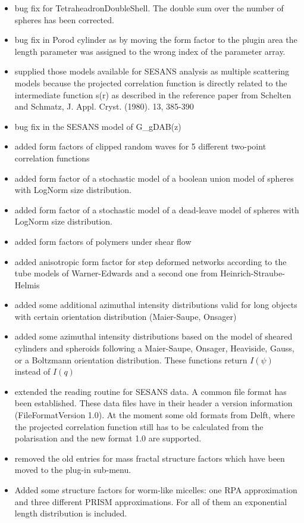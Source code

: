 \begin{description}
\begin{itemize}
    \item bug fix for TetraheadronDoubleShell. The double sum over the number of spheres has been corrected.
    \item bug fix in Porod cylinder as by moving the form factor to the plugin area the length parameter was assigned to the wrong index of the parameter array.
    \item supplied those models available for SESANS analysis as multiple scattering models because the projected correlation function is directly related to the intermediate function s(r) as described in the reference paper from Schelten and Schmatz, J. Appl. Cryst. (1980). 13, 385-390
    \item bug fix in the SESANS model of G\_gDAB(z)
    \item added form factors of clipped random waves for 5 different two-point correlation functions
    \item added form factor of a stochastic model of a boolean union model of spheres with LogNorm size distribution.
    \item added form factor of a stochastic model of a dead-leave model of spheres with LogNorm size distribution.
    \item added form factors of polymers under shear flow
    \item added anisotropic form factor for step deformed networks according to the tube models of Warner-Edwards and a second one from Heinrich-Straube-Helmis
     \item added some additional azimuthal intensity distributions valid for long objects with certain orientation distribution (Maier-Saupe, Onsager)
     \item added some azimuthal intensity distributions based on the model of sheared cylinders and spheroids following a Maier-Saupe, Onsager, Heaviside, Gauss, or a Boltzmann orientation distribution. These functions return $I(\psi)$ instead of $I(q)$
     \item extended the reading routine for SESANS data. A common file format has been established. These data files have in their header a version information (FileFormatVersion 1.0). At the moment some old formats from Delft, where the projected correlation function still has to be calculated from the polarisation and the new format 1.0 are supported.
    \item  removed the old entries for mass fractal structure factors which have been moved to the plug-in sub-menu.
    \item Added some structure factors for worm-like micelles: one RPA approximation and three different PRISM approximations. For all of them an exponential length distribution is included.

\end{itemize}
\end{description}
